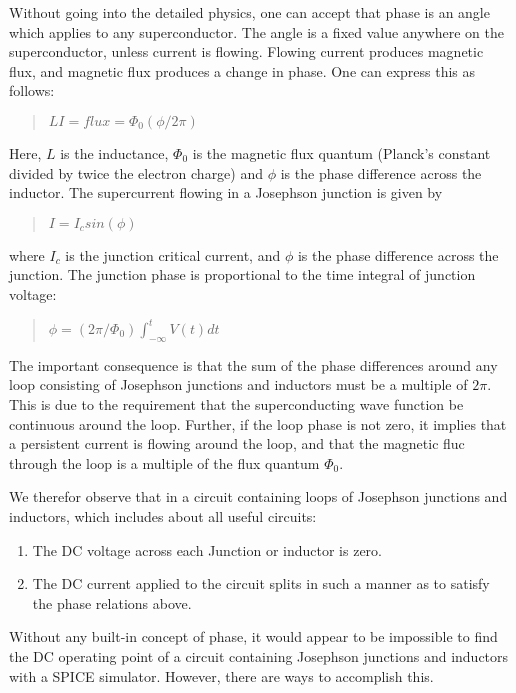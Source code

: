 Without going into the detailed physics, one can accept that phase is
an angle which applies to any superconductor.  The angle is a fixed
value anywhere on the superconductor, unless current is flowing. 
Flowing current produces magnetic flux, and magnetic flux produces a
change in phase.  One can express this as follows:

\begin{quote}
$LI = flux = \Phi_0(\phi/2\pi)$
\end{quote}

Here, $L$ is the inductance, $\Phi_0$ is the magnetic flux quantum
(Planck's constant divided by twice the electron charge) and $\phi$ is
the phase difference across the inductor.  The supercurrent flowing in
a Josephson junction is given by

\begin{quote}
$I = I_c sin(\phi)$
\end{quote}

where $I_c$ is the junction critical current, and $\phi$ is the phase
difference across the junction.  The junction phase is proportional to
the time integral of junction voltage:

\begin{quote}
$\phi = (2\pi/\Phi_0)\int^t_{-\infty} V(t)dt$
\end{quote}

The important consequence is that the sum of the phase differences
around any loop consisting of Josephson junctions and inductors must
be a multiple of $2\pi$.  This is due to the requirement that the
superconducting wave function be continuous around the loop.  Further,
if the loop phase is not zero, it implies that a persistent current is
flowing around the loop, and that the magnetic fluc through the loop
is a multiple of the flux quantum $\Phi_0$.

We therefor observe that in a circuit containing loops of Josephson
junctions and inductors, which includes about all useful circuits:

\begin{enumerate}
\item{The DC voltage across each Junction or inductor is zero.}
\item{The DC current applied to the circuit splits in such a manner
as to satisfy the phase relations above.}
\end{enumerate}

Without any built-in concept of phase, it would appear to be
impossible to find the DC operating point of a circuit containing
Josephson junctions and inductors with a SPICE simulator.  However,
there are ways to accomplish this.

